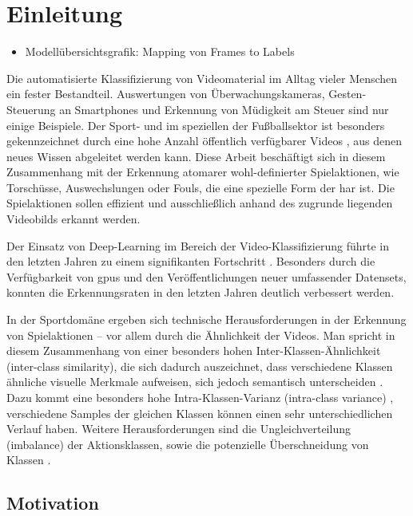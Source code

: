 \chapter{Einleitung}
\label{ch:intro}

\begin{tcolorbox}[title=Todo]
 \begin{itemize}
  \item Modellübersichtsgrafik: Mapping von Frames to Labels
 \end{itemize}
 \end{tcolorbox}

Die automatisierte Klassifizierung von Videomaterial im Alltag vieler Menschen ein fester Bestandteil.
Auswertungen von Überwachungskameras, Gesten-Steuerung an Smartphones und Erkennung von Müdigkeit am Steuer sind nur einige Beispiele.
Der Sport- und im speziellen der Fußballsektor ist besonders gekennzeichnet durch eine hohe Anzahl öffentlich verfügbarer Videos \cite{Giancola18}, aus denen neues Wissen abgeleitet werden kann.
Diese Arbeit beschäftigt sich in diesem Zusammenhang mit der Erkennung atomarer wohl-definierter Spielaktionen, wie Torschüsse, Auswechslungen oder Fouls, die eine spezielle Form der \gls{har} ist.
Die Spielaktionen sollen effizient und ausschließlich anhand des zugrunde liegenden Videobilds erkannt werden.

Der Einsatz von Deep-Learning im Bereich der Video-Klassifizierung führte in den letzten Jahren zu einem signifikanten Fortschritt \cite{Abu-Bakar19}.
Besonders durch die Verfügbarkeit von \gls{gpu}s und den Veröffentlichungen neuer umfassender Datensets, konnten die Erkennungsraten in den letzten Jahren deutlich verbessert werden. %

In der Sportdomäne ergeben sich technische Herausforderungen in der Erkennung von Spielaktionen -- vor allem durch die Ähnlichkeit der Videos.
Man spricht in diesem Zusammenhang von einer besonders hohen Inter-Klassen-Ähnlichkeit (inter-class similarity), die sich dadurch auszeichnet, dass verschiedene Klassen ähnliche visuelle Merkmale aufweisen, sich jedoch semantisch unterscheiden \cite{Sozykin17}.
Dazu kommt eine besonders hohe Intra-Klassen-Varianz (intra-class variance) \cite{Ballan09}, \dh verschiedene Samples der gleichen Klassen können einen sehr unterschiedlichen Verlauf haben.
Weitere Herausforderungen sind die Ungleichverteilung (imbalance) der Aktionsklassen, sowie die potenzielle Überschneidung von Klassen \cite{Jiang19}.

\section{Motivation}
\label{sec:motivation}

